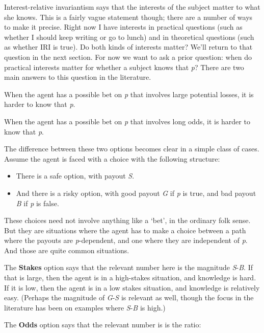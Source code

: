 \documentclass[
  10pt,
  letterpaper,
  DIV=11,
  numbers=noendperiod,
  twoside]{scrartcl}
\providecommand{\tightlist}{%
  \setlength{\itemsep}{0pt}\setlength{\parskip}{0pt}}\usepackage{longtable,booktabs,array}
\begin{document}
Interest-relative invariantism says that the interests of the subject
matter to what she knows. This is a fairly vague statement though; there
are a number of ways to make it precise. Right now I have interests in
practical questions (such as whether I should keep writing or go to
lunch) and in theoretical questions (such as whether IRI is true). Do
both kinds of interests matter? We'll return to that question in the
next section. For now we want to ask a prior question: when do practical
interests matter for whether a subject knows that \emph{p}? There are
two main answers to this question in the literature.

\begin{description}
\tightlist
\item[Stakes]
When the agent has a possible bet on \emph{p} that involves large
potential losses, it is harder to know that \emph{p}.
\item[Odds]
When the agent has a possible bet on \emph{p} that involves long odds,
it is harder to know that \emph{p}.
\end{description}

The difference between these two options becomes clear in a simple class
of cases. Assume the agent is faced with a choice with the following
structure:

\begin{itemize}
\tightlist
\item
  There is a safe option, with payout \emph{S}.
\item
  And there is a risky option, with good payout \emph{G} if \emph{p} is
  true, and bad payout \emph{B} if \emph{p} is false.
\end{itemize}

These choices need not involve anything like a `bet', in the ordinary
folk sense. But they are situations where the agent has to make a choice
between a path where the payouts are \emph{p}-dependent, and one where
they are independent of \emph{p}. And those are quite common situations.

The \textbf{Stakes} option says that the relevant number here is the
magnitude \emph{S}-\emph{B}. If that is large, then the agent is in a
high-stakes situation, and knowledge is hard. If it is low, then the
agent is in a low stakes situation, and knowledge is relatively easy.
(Perhaps the magnitude of \emph{G}-\emph{S} is relevant as well, though
the focus in the literature has been on examples where \emph{S}-\emph{B}
is high.)

The \textbf{Odds} option says that the relevant number is is the ratio:
\end{document}
